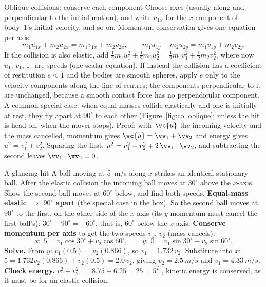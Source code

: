 \begin{methodbox}{Oblique collisions: conserve each component}
Choose axes (usually along and perpendicular to the initial motion), and write $u_{1x}$ for the
$x$-component of body~1's initial velocity, and so on. Momentum conservation gives one equation per axis:
\[
m_1u_{1x}+m_2u_{2x}=m_1v_{1x}+m_2v_{2x},\qquad m_1u_{1y}+m_2u_{2y}=m_1v_{1y}+m_2v_{2y}.
\]
If the collision is also elastic, add $\tfrac12 m_1u_1^2+\tfrac12 m_2u_2^2=\tfrac12 m_1v_1^2+\tfrac12
m_2v_2^2$, where now $u_1$, $v_1$, \dots\ are speeds (one scalar equation). If instead the collision has a coefficient of restitution $e<1$ and the bodies are smooth
spheres, apply $e$ only to the velocity components along the line of centres; the components perpendicular
to it are unchanged, because a smooth contact force has no perpendicular component. A common special case: when equal masses collide elastically and one is initially at rest,
they fly apart at \textbf{$90^\circ$} to each other (Figure~\ref{fig:colloblique}; unless the hit is head-on, when the mover stops).
Proof: with $\vc{u}$ the incoming velocity and the mass cancelled, momentum gives $\vc{u}=\vv_1+\vv_2$ and
energy gives $u^2=v_1^2+v_2^2$.
Squaring the first, $u^2=v_1^2+v_2^2+2\,\vv_1\cdot\vv_2$, and subtracting the second leaves
$\vv_1\cdot\vv_2=0$.
\end{methodbox}

\begin{exbox}{A glancing hit}
A ball moving at \SI{5}{m/s} along $x$ strikes an identical stationary ball. After the elastic collision
the incoming ball moves at $30^\circ$ above the $x$-axis. Show the second ball moves at $60^\circ$ below,
and find both speeds.
 \textbf{Equal-mass elastic $\Rightarrow$ $90^\circ$ apart} (the special case in the box). So the
second ball moves at $90^\circ$ to the first, on the other side of the $x$-axis (its $y$-momentum must
cancel the first ball's): $30^\circ-90^\circ=-60^\circ$, that is, $60^\circ$ below the $x$-axis.
 \textbf{Conserve momentum per axis} to get the two speeds $v_1$, $v_2$ (mass cancels):
\[
x:\ 5=v_1\cos30^\circ+v_2\cos60^\circ,\qquad
y:\ 0=v_1\sin30^\circ-v_2\sin60^\circ.
\]
 \textbf{Solve.} From $y$: $v_1(0.5)=v_2(0.866)$, so $v_1=1.732\,v_2$. Substitute into $x$:
$5=1.732v_2(0.866)+v_2(0.5)=2.0\,v_2$, giving $v_2=\SI{2.5}{m/s}$ and $v_1=\SI{4.33}{m/s}$.
 \textbf{Check energy.} $v_1^2+v_2^2=18.75+6.25=25=5^2$ \checkmark, kinetic energy is
conserved, as it must be for an elastic collision. 
\end{exbox}

